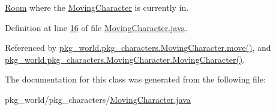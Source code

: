 \hyperlink{classpkg__world_1_1Room}{Room} where the \hyperlink{classpkg__world_1_1pkg__characters_1_1MovingCharacter}{Moving\-Character} is currently in. 



Definition at line \hyperlink{MovingCharacter_8java_source_l00016}{16} of file \hyperlink{MovingCharacter_8java_source}{Moving\-Character.\-java}.



Referenced by \hyperlink{MovingCharacter_8java_source_l00059}{pkg\-\_\-world.\-pkg\-\_\-characters.\-Moving\-Character.\-move()}, and \hyperlink{MovingCharacter_8java_source_l00026}{pkg\-\_\-world.\-pkg\-\_\-characters.\-Moving\-Character.\-Moving\-Character()}.



The documentation for this class was generated from the following file\-:\begin{DoxyCompactItemize}
\item 
pkg\-\_\-world/pkg\-\_\-characters/\hyperlink{MovingCharacter_8java}{Moving\-Character.\-java}\end{DoxyCompactItemize}
